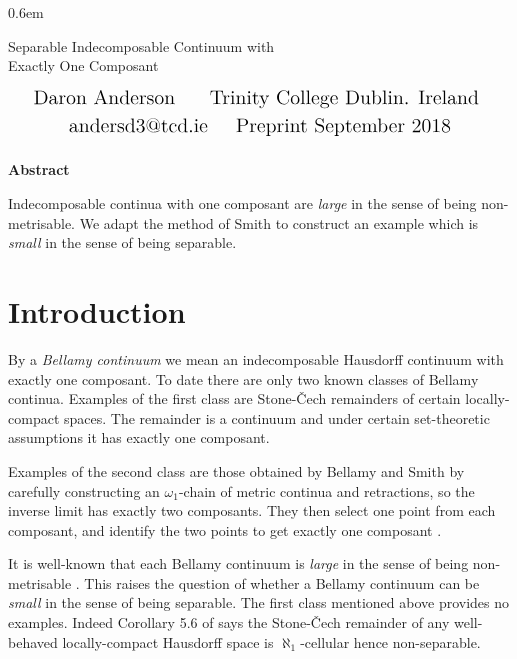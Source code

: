 \documentclass[12pt]{article}
\theoremstyle{plain}
\theoremstyle{definition}
\newcommand{\W}{\ensuremath{\omega}}
\newcommand{\0}{\ensuremath{\varnothing}}
\begin{document}
 

\openup 0.6em

\fontsize{13}{5}
\selectfont
 
	 
	
	\begin{center}\LARGE Separable Indecomposable Continuum with\\ Exactly One Composant
	\end{center}
	
	\begin{align*}
	\text{\Large Daron Anderson }  \qquad \text{\Large Trinity College Dublin. Ireland }  
	\end{align*} 
	\begin{align*} \text{\Large andersd3@tcd.ie} \qquad \text{\Large Preprint September 2018}  
	\end{align*}$ $\\
	
	
	
	
	\begin{center}
		\textbf{ \large Abstract}
	\end{center}
	
	\noindent
	Indecomposable continua with one composant are \textit{large} in the sense of being non-metrisable.
	We adapt the method of Smith \cite{Smith1} to construct an example which is \textit{small} in the sense of being separable.
	
	
	\section{Introduction}
	
	\noindent By a \textit{Bellamy continuum} we mean an indecomposable Hausdorff continuum with exactly one composant.
	To date there are only two known classes of Bellamy continua. Examples of the first class are Stone-\v Cech remainders of certain locally-compact spaces. The remainder is a continuum and under certain set-theoretic assumptions \cite{waves,NCF2,BitLike} it has exactly one composant.	
	
	Examples of the second class are those obtained by Bellamy and Smith 
	by carefully constructing an $\W_1$-chain of metric continua and retractions,
	so the inverse limit has exactly two composants. They then select one point from each composant, and identify the two points to get exactly one composant \cite{one, smith2,Smith1, HI2Composants}.
	
	It is well-known that each Bellamy continuum is \textit{large} in the sense of being non-metrisable \cite{nadlerbook}.
	This raises the question of whether a Bellamy continuum can be \textit{small} in the sense of being separable.
	The first class mentioned above provides no examples.
	Indeed Corollary 5.6 of \cite{CSbook} says the Stone-\v Cech remainder of any well-behaved locally-compact Hausdorff space 
	is $\aleph_1$-cellular hence non-separable.
	
\end{document}
